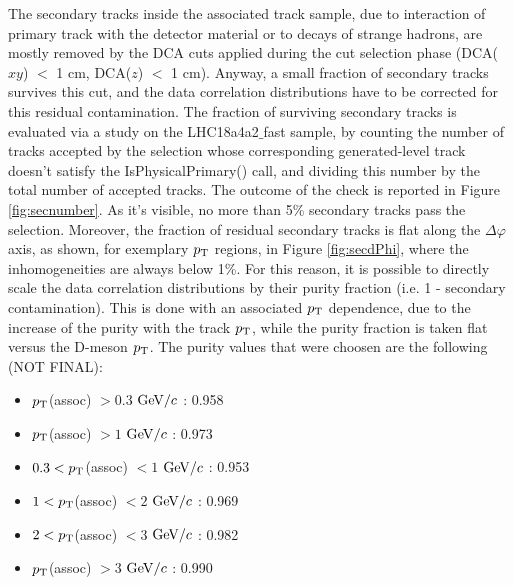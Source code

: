\label{secondaries}
The secondary tracks inside the associated track sample, due to interaction of primary track with the detector material or to decays of strange hadrons, are mostly removed by the DCA cuts applied during the cut selection phase (DCA($xy$) $<$ 1 cm, DCA($z$) $<$ 1 cm).
Anyway, a small fraction of secondary tracks survives this cut, and the data correlation distributions have to be corrected for this residual contamination.
The fraction of surviving secondary tracks is evaluated via a study on the LHC18a4a2$\_$fast sample, by counting the number of tracks accepted by the selection whose corresponding generated-level track doesn't satisfy the IsPhysicalPrimary() call, and dividing this number by the total number of accepted tracks.
The outcome of the check is reported in Figure \ref{fig:secnumber}. As it's visible, no more than 5\% secondary tracks pass the selection. Moreover, the fraction of residual secondary tracks is flat along the $\Delta\varphi$ axis, as shown, for exemplary $p_{\rm T}$ regions, in Figure \ref{fig:secdPhi}, where the inhomogeneities are always below 1\%.
For this reason, it is possible to directly scale the data correlation distributions by their purity fraction (i.e. 1 - secondary contamination). This is done with an associated $p_{\rm T}$ dependence, due to the increase of the purity with the track $p_{\rm T}$, while the purity fraction is taken flat versus the D-meson $p_{\rm T}$.
The purity values that were choosen are the following (NOT FINAL):
\begin{itemize}
  \item $p_{\rm T}$(assoc) $> 0.3$ $\mathrm{GeV}/c$ : 0.958
  \item $p_{\rm T}$(assoc) $> 1$ $\mathrm{GeV}/c$ : 0.973
  \item $0.3 < p_{\rm T}$(assoc) $< 1$ $\mathrm{GeV}/c$ : 0.953
  \item $1 < p_{\rm T}$(assoc) $< 2$ $\mathrm{GeV}/c$ : 0.969
  \item $2 < p_{\rm T}$(assoc) $< 3$ $\mathrm{GeV}/c$ : 0.982
  \item $p_{\rm T}$(assoc) $> 3$ $\mathrm{GeV}/c$ : 0.990
\end{itemize}


